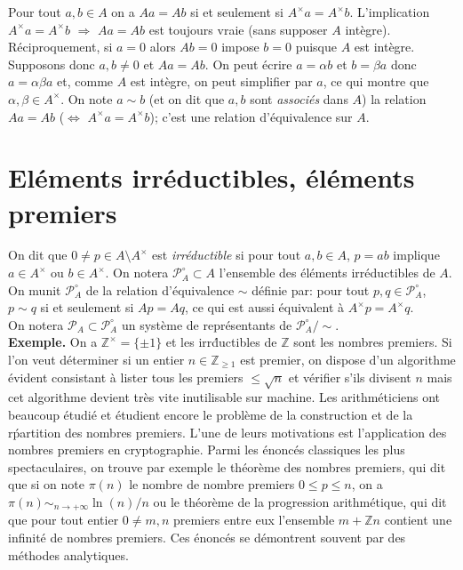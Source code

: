 \documentclass[a4paper, oneside, 12pt]{book}
\theoremstyle{definition} %
\newcommand{\Z}{\mathbb{Z}}
\begin{document}
  Pour tout $a,b\in A$ on a $Aa=Ab$ si et seulement si $A^\times a=A^\times b$. L'implication $A^\times a=A^\times b$ $\Rightarrow$ $Aa=Ab$ est toujours vraie (sans supposer $A$ intègre). Réciproquement,   si $a=0$ alors $Ab=0$ impose $b=0$ puisque $A$ est intègre. Supposons donc $a,b\not= 0$ et $Aa=Ab$. On peut écrire $a=\alpha b$ et $b=\beta a$ donc $a=\alpha\beta a$ et, comme $A$ est intègre, on peut simplifier par $a$, ce qui montre que $\alpha,\beta\in A^\times$. On note $a\sim b$ (et on dit que $a,b$ sont \textit{associés} dans $A$) la relation $Aa=Ab$ ($\Leftrightarrow$ $A^\times a=A^\times b$); c'est une relation d'équivalence sur $A$.
 

 
 
\section{Eléments irréductibles, éléments premiers}\label{IrrPrem}On dit que $0\not=p\in A\setminus A^\times$  est \textit{irréductible} si pour tout $a,b\in A$, $p=ab$ implique $a\in A^\times$ ou $b\in A^\times$. On notera $\mathcal{P}_A^\circ\subset A$ l'ensemble des éléments irréductibles de $A$.
  On munit  $\mathcal{P}_A^\circ$ de la relation d'équivalence $\sim$ définie par: pour tout $p,q\in \mathcal{P}_A^\circ$, $p\sim q$ si et seulement si $Ap=Aq$, ce qui est aussi équivalent à  $A^\times p=A^\times q$.\\
  
   On notera $\mathcal{P}_A\subset \mathcal{P}_A^\circ$ un système de représentants de $\mathcal{P}_A^\circ/\sim$.\\
  
  
  
  \textbf{Exemple.} On a $\Z^\times=\lbrace \pm 1\rbrace$ et les irr\'ductibles de $\Z$ sont les nombres premiers. Si l'on veut déterminer si un entier $n\in\Z_{\geq 1}$ est premier, on dispose d'un algorithme évident consistant à lister tous les premiers $\leq \sqrt{n}$ et vérifier s'ils divisent $n$ mais cet algorithme devient très vite inutilisable sur machine. Les arithméticiens ont beaucoup étudié et étudient encore  le problème de la construction et de la r\'partition des nombres premiers.  L'une de leurs motivations  est l'application des nombres premiers en cryptographie. Parmi les énoncés classiques  les plus spectaculaires, on trouve par exemple le théorème des nombres premiers, qui dit que si on note $\pi(n)$ le nombre de nombre premiers $0\leq  p\leq n$, on a $\pi(n)\sim_{n\to+\infty} \ln(n)/n$ ou le théorème de   la progression arithmétique, qui dit que pour tout entier $0\not= m,n$ premiers entre eux l'ensemble $m+\Z n$ contient une infinité de nombres premiers. Ces énoncés se démontrent souvent par des méthodes analytiques. \\
  
\end{document}
